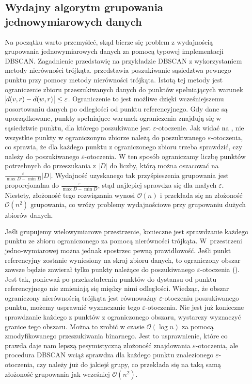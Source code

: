 \subsection{Wydajny algorytm grupowania jednowymiarowych danych}
Na początku warto przemyśleć, skąd bierze się problem z wydajnością grupowania jednowymiarowych danych za pomocą typowej implementacji DBSCAN. Zagadnienie przedstawię na przykładzie DBSCAN z wykorzystaniem metody nierówności trójkąta.  przedstawia poszukiwanie sąsiedztwa pewnego punktu przy pomocy metody nierówności trójkąta. Istotą tej metody jest ograniczenie zbioru przeszukiwanych danych do punktów spełniających warunek $ \abs{d(v, r) - d(w, r)} \le \varepsilon $. Ograniczenie to jest możliwe dzięki wcześniejszemu posortowaniu danych po odległości od punktu referencyjnego. Gdy dane są uporządkowane, punkty spełniające warunek ograniczenia znajdują się w sąsiedztwie punktu, dla którego poszukiwane jest $ \varepsilon $-otoczenie. Jak widać na , nie wszystkie punkty w ograniczonym zbiorze należą do poszukiwanego $ \varepsilon $-otoczenia, co sprawia, że dla każdego punktu z ograniczonego zbioru trzeba sprawdzić, czy należy do poszukiwanego $ \varepsilon $-otoczenia. W ten sposób ograniczamy liczbę punktów potrzebnych do przeszukania z $ |D| $ do liczby, którą można oszacować na $ \frac{\varepsilon}{\max{D}-\min{D}}|D| $. Wydajność uzyskanego tak przyśpieszenia grupowania jest proporcjonalna do $ \frac{\varepsilon}{\max{D}-\min{D}} $, stąd najlepiej sprawdza się dla małych $ \varepsilon $. Niestety, złożoność tego rozwiązania wynosi $ \mathcal{O}(n) $ i przekłada się na złożoność $ \mathcal{O}(n^2) $ grupowania, co wróży problemy wydajnościowe przy grupowaniu dużych zbiorów danych.\par



Jeśli grupujemy wielowymiarowe przestrzenie, konieczne jest sprawdzanie każdego punktu ze zbioru ograniczonego za pomocą nierówności trójkąta. \mbox{W przestrzeni} jedno-wymiarowej można jednak spostrzec pewną prawidłowość. Jeśli punkt referencyjny zostanie wyniesiony na skraj zbioru danych, to ograniczony obszar zawsze będzie zawierał tylko punkty należące do poszukiwanego $ \varepsilon $-otoczenia (). Jest tak, ponieważ po przekształceniu punktów do dystansu od punktu referencyjnego nie zmieniają się między nimi odległości. Wiedząc, że obszar ograniczony nierównością trójkąta jest równoważny $ \varepsilon $-otoczeniu poszukiwanego punktu, możemy usprawnić wyznaczanie tego $ \varepsilon $-otoczenia. Nie jest już konieczne sprawdzanie każdego z punktów z ograniczonego obszaru, wystarczy wyznaczyć granice tego obszaru. Można to zrobić w czasie $ \mathcal{O}(\log{}n) $ za pomocą zmodyfikowanego przeszukiwania binarnego\cite{binaryboundarysearch}. Jest to usprawnienie, które co prawda daje nam lepszą pesymistyczną złożoność znajdowania $ \varepsilon $-otoczenia, ale procedura DBSCAN wciąż sprawdza dla każdego punktu znalezionego $ \varepsilon $-otoczenia, czy należy już do jakiejś grupy, co przekłada się na taką samą złożoność grupowania jak wcześniej $ \mathcal{O}(n^2) $.\par

